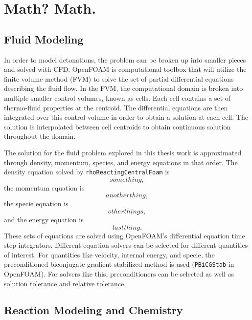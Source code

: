 \chapter{Math? Math.}
\label{math}

\section{Fluid Modeling}
In order to model detonations, the problem can be broken up into smaller pieces and solved with CFD. OpenFOAM is computational toolbox that will utilize the finite volume method (FVM) to solve the set of partial differential equations describing the fluid flow. In the FVM, the computational domain is broken into multiple smaller control volumes, known as cells. Each cell contains a set of thermo-fluid properties at the centroid. The differential equations are then integrated over this control volume in order to obtain a solution at each cell. The solution is interpolated between cell centroids to obtain continuous solution throughout the domain. 

The solution for the fluid problem explored in this thesis work is approximated through density, momentum, species, and energy equations in that order. The density equation solved by \verb|rhoReactingCentralFoam| is
\[something,\]
the momentum equation is
\[another thing,\]
the specie equation is
\[other things,\]
and the energy equation is
\[last thing.\]
These sets of equations are solved using OpenFOAM's differential equation time step integrators. Different equation solvers can be selected for different quantities of interest. For quantities like velocity, internal energy, and specie, the preconditioned biconjugate gradient stabilized method is used (\verb|PBiCGStab| in OpenFOAM). For solvers like this, preconditioners can be selected as well as solution tolerance and relative tolerance. 


\section{Reaction Modeling and Chemistry}

\section{}


